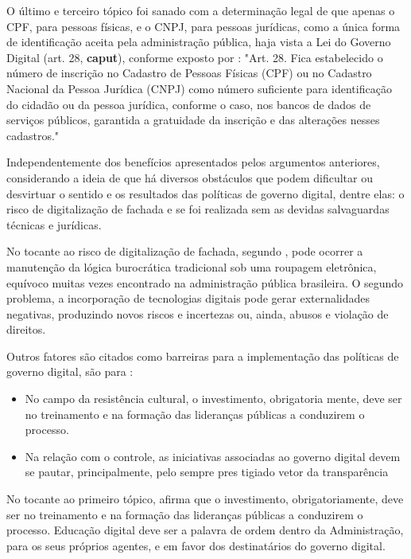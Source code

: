O último e terceiro tópico foi sanado com a determinação legal de que apenas o CPF, para pessoas físicas, e o CNPJ, para pessoas jurídicas, como a única forma de identificação aceita pela administração pública, haja vista a Lei do Governo Digital (art. 28, \textbf{caput}), conforme exposto por \cite{l14129}: "Art. 28.  Fica estabelecido o número de inscrição no Cadastro de Pessoas Físicas (CPF) ou no Cadastro Nacional da Pessoa Jurídica (CNPJ) como número suficiente para identificação do cidadão ou da pessoa jurídica, conforme o caso, nos bancos de dados de serviços públicos, garantida a gratuidade da inscrição e das alterações nesses cadastros."

Independentemente dos benefícios apresentados pelos argumentos anteriores, considerando \cite{de2020governo} a ideia de que há diversos obstáculos que podem dificultar ou desvirtuar o sentido e os resultados das políticas de governo digital, dentre elas: o risco de digitalização de fachada e se foi realizada sem as devidas salvaguardas técnicas e jurídicas.

No tocante ao risco de digitalização de fachada, segundo \cite{de2020governo}, pode ocorrer a manutenção da lógica burocrática tradicional sob uma roupagem eletrônica, equívoco muitas vezes encontrado na administração pública brasileira. O segundo problema, a incorporação de tecnologias digitais pode gerar externalidades negativas, produzindo novos riscos e incertezas ou, ainda, abusos e violação de direitos.

Outros fatores são citados como barreiras para a implementação das políticas de governo digital, são para \cite{do2022governo}: 

\begin{itemize}
    \item No campo da resistência cultural, o investimento, obrigatoria
    mente, deve ser no treinamento e na formação das lideranças públicas 
    a conduzirem o processo.
    \item Na relação com o controle, as iniciativas associadas 
    ao governo digital devem se pautar, principalmente, pelo sempre pres
    tigiado vetor da transparência
\end{itemize}

No tocante ao primeiro tópico, \cite{do2022governo} afirma que o investimento, obrigatoriamente, deve ser no treinamento e na formação das lideranças públicas 
a conduzirem o processo. Educação digital deve ser a palavra de ordem dentro da Administração, para os seus próprios agentes, e em favor dos destinatários do governo digital. 

